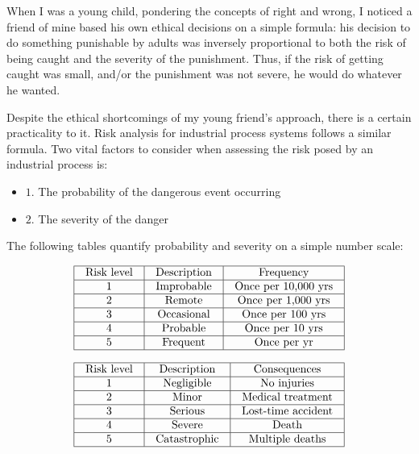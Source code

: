 

When I was a young child, pondering the concepts of right and wrong, I noticed a friend of mine based his own ethical decisions on a simple formula: his decision to do something punishable by adults was inversely proportional to both the risk of being caught and the severity of the punishment.  Thus, if the risk of getting caught was small, and/or the punishment was not severe, he would do whatever he wanted.

\vskip 10pt

Despite the ethical shortcomings of my young friend's approach, there is a certain practicality to it.  Risk analysis for industrial process systems follows a similar formula.  Two vital factors to consider when assessing the risk posed by an industrial process is:

\begin{itemize}
\item{$1.$} The probability of the dangerous event occurring
\item{$2.$} The severity of the danger
\end{itemize}

The following tables quantify probability and severity on a simple number scale:


$$\vbox{\offinterlineskip
\halign{\strut
\vrule \quad\hfil # \ \hfil & 
\vrule \quad\hfil # \ \hfil & 
\vrule \quad\hfil # \ \hfil \vrule \cr
\noalign{\hrule}
%
Risk level & Description & Frequency \cr
%
\noalign{\hrule}
%
1 & Improbable & Once per 10,000 yrs \cr
%
\noalign{\hrule}
%
2 & Remote & Once per 1,000 yrs \cr
%
\noalign{\hrule}
%
3 & Occasional & Once per 100 yrs \cr
%
\noalign{\hrule}
%
4 & Probable & Once per 10 yrs \cr
%
\noalign{\hrule}
%
5 & Frequent & Once per yr \cr
%
\noalign{\hrule}
} %
}$$ %




$$\vbox{\offinterlineskip
\halign{\strut
\vrule \quad\hfil # \ \hfil & 
\vrule \quad\hfil # \ \hfil & 
\vrule \quad\hfil # \ \hfil \vrule \cr
\noalign{\hrule}
%
Risk level & Description & Consequences \cr
%
\noalign{\hrule}
%
1 & Negligible & No injuries \cr
%
\noalign{\hrule}
%
2 & Minor & Medical treatment \cr
%
\noalign{\hrule}
%
3 & Serious & Lost-time accident \cr
%
\noalign{\hrule}
%
4 & Severe & Death \cr
%
\noalign{\hrule}
%
5 & Catastrophic & Multiple deaths \cr
%
\noalign{\hrule}
} %
}$$ %

